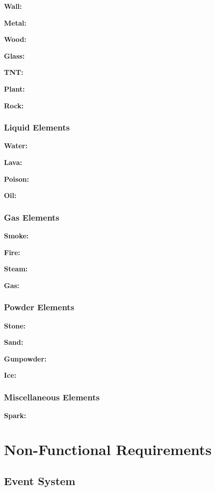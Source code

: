 \documentclass[12pt]{article}
\begin{document}
    \textbf{Wall:}

    \textbf{Metal:}

    \textbf{Wood:}

    \textbf{Glass:}
    
    \textbf{TNT:}

    \textbf{Plant:}

    \textbf{Rock:}

    \subsubsection{Liquid Elements}

    \textbf{Water:}

    \textbf{Lava:}

    \textbf{Poison:}

    \textbf{Oil:}

    \subsubsection{Gas Elements}

    \textbf{Smoke:}

    \textbf{Fire:}

    \textbf{Steam:}

    \textbf{Gas:}

    \subsubsection{Powder Elements}

    \textbf{Stone:}

    \textbf{Sand:}

    \textbf{Gunpowder:}

    \textbf{Ice:}

    \subsubsection{Miscellaneous Elements}

    \textbf{Spark:}

    \section{Non-Functional Requirements}

    \subsection{Event System}
\end{document}
